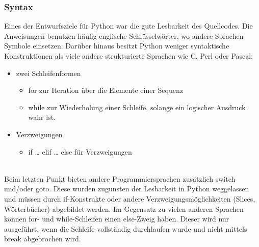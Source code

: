 \subsubsection{Syntax}
Eines der Entwurfsziele für Python war die gute Lesbarkeit des Quellcodes. Die Anweisungen benutzen häufig englische Schlüsselwörter, wo andere Sprachen Symbole einsetzen. Darüber hinaus besitzt Python weniger syntaktische Konstruktionen als viele andere strukturierte Sprachen wie C, Perl oder Pascal:\\
\begin{itemize}
\item zwei Schleifenformen
	\begin{itemize}
		\item for zur Iteration über die Elemente einer Sequenz
		\item while zur Wiederholung einer Schleife, solange ein logischer Ausdruck wahr ist.
	\end{itemize}
\item Verzweigungen
	\begin{itemize}
		\item if … elif … else für Verzweigungen
	\end{itemize}
\end{itemize}
\ \\
Beim letzten Punkt bieten andere Programmiersprachen zusätzlich switch und/oder goto. Diese wurden zugunsten der Lesbarkeit in Python weggelassen und müssen durch if-Konstrukte oder andere Verzweigungsmöglichkeiten (Slices, Wörterbücher) abgebildet werden. Im Gegensatz zu vielen anderen Sprachen können for- und while-Schleifen einen else-Zweig haben. Dieser wird nur ausgeführt, wenn die Schleife vollständig durchlaufen wurde und nicht mittels break abgebrochen wird.

